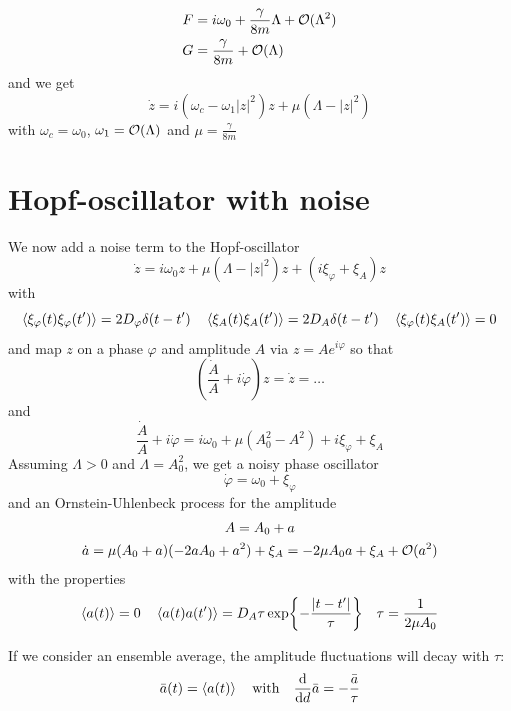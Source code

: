 \documentclass{/home/ben/Templates/notebook}
\begin{document}
	\begin{align*}
		F &= i \omega_0 + \frac{\gamma}{8m} \Lambda + \mathcal{O}(\Lambda^2) \\
		G &= \frac{\gamma}{8m} + \mathcal{O}(\Lambda)
	\end{align*}
	and we get
	\begin{equation}
	\dot{z} = i (\omega_c - \omega_1 |z|^2)z + \mu(\Lambda - |z|^2)
	\end{equation}
	with $\omega_c = \omega_0$, $\omega_1 = \mathcal{O}(\Lambda)$ and $\mu = \frac{\gamma}{8m}$
	
	\section{Hopf-oscillator with noise}
	
	We now add a noise term to the Hopf-oscillator
	\begin{equation}
	\dot{z} = i \omega_0 z + \mu(\Lambda - |z|^2)z + (i \xi_{\varphi} + \xi_A) z
	\end{equation}
	with 
	\begin{equation*}
		\expval{\xi_{\varphi}(t)\xi_{\varphi}(t')} = 2 D_{\varphi} \delta(t-t') \quad \expval{\xi_A(t)\xi_A(t')} = 2 D_A \delta(t-t') \quad
		\expval{\xi_{\varphi}(t)\xi_A(t')} = 0
	\end{equation*}
	and map $z$ on a phase $\varphi$ and amplitude $A$ via $z = A e^{i \varphi}$ so that
	\begin{equation}
	\left( \frac{\dot{A}}{A} + i \dot{\varphi} \right) z = \dot{z} = \dots
	\end{equation}
	and
	\begin{equation}
	\frac{\dot{A}}{A} + i \dot{\varphi} = i \omega_0 + \mu(A_0^2- A^2) + i \xi_{\varphi} + \xi_A
	\end{equation}
	Assuming $\Lambda > 0$ and $\Lambda = A_0^2$, we get a noisy phase oscillator
	\begin{equation}
	\dot{\varphi} = \omega_0 + \xi_{\varphi}
	\end{equation}
	and an Ornstein-Uhlenbeck process for the amplitude
	\begin{equation}
	\begin{gathered}
	A = A_0 + a \\
	\dot{a} = \mu(A_0 + a)(-2 a A_0 + a^2) + \xi_A = -2\mu A_0 a + \xi_A + \mathcal{O}(a^2)
	\end{gathered}
	\end{equation}
	with the properties
	\begin{equation*}
		\expval{a(t)} = 0 \quad \expval{a(t)a(t')} = D_A \tau \exp{- \frac{|t-t'|}{\tau}} \quad \tau = \frac{1}{2 \mu A_0}
	\end{equation*}
	\begin{remark}[Remark]
		If we consider an ensemble average, the amplitude fluctuations will decay with $\tau$: 
		\begin{equation*}
			\bar{a}(t) = \expval{a(t)} \quad \mathrm{with} \quad \dv{d} \bar{a} = - \frac{\bar{a}}{\tau}
		\end{equation*}
	\end{remark}
	
\end{document}

